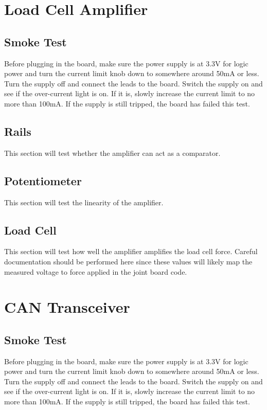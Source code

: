 \documentclass[12pt,letterpaper]{article}
\begin{document}
	\newpage
	\section{Load Cell Amplifier}
	\subsection{Smoke Test}
	Before plugging in the board, make sure the power supply is at 3.3V for logic power and turn the current limit knob down to somewhere around 50mA or less. Turn the supply off and connect the leads to the board. Switch the supply on and see if the over-current light is on. If it is, slowly increase the current limit to no more than 100mA. If the supply is still tripped, the board has failed this test.
	
	\subsection{Rails}
	This section will test whether the amplifier can act as a comparator. 
	
	\subsection{Potentiometer}
	This section will test the linearity of the amplifier. 
	
	\subsection{Load Cell}
	This section will test how well the amplifier amplifies the load cell force. Careful documentation should be performed here since these values will likely map the measured voltage to force applied in the joint board code.
	
	\newpage
	\section{CAN Transceiver}
	\subsection{Smoke Test}
	Before plugging in the board, make sure the power supply is at 3.3V for logic power and turn the current limit knob down to somewhere around 50mA or less. Turn the supply off and connect the leads to the board. Switch the supply on and see if the over-current light is on. If it is, slowly increase the current limit to no more than 100mA. If the supply is still tripped, the board has failed this test.
	
\end{document}
